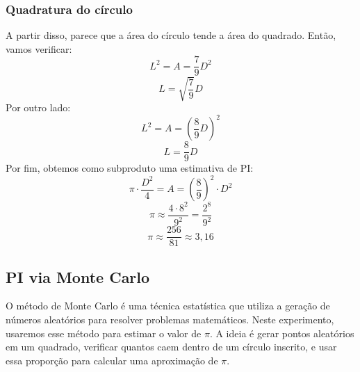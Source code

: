 \documentclass[12pt]{article}
\begin{document}
\subsubsection{Quadratura do círculo}
A partir disso, parece que a área do círculo tende a área do quadrado. Então, vamos verificar:
\[L^2=A=\frac{7}{9}D^2 \]
\[L=\sqrt{\frac{7}{9}}D\]
Por outro lado:
\[L^2=A=\left(\frac{8}{9}D\right)^2\]
\[L=\frac{8}{9}D\]
Por fim, obtemos como subproduto uma estimativa de PI:
\[\pi\cdot\frac{D^2}{4}=A=\left(\frac{8}{9}\right)^2\cdot D^2\]
\[\pi\approx\frac{4\cdot 8^2}{9^2}=\frac{2^8}{9^2}\]
\[\pi\approx\frac{256}{81}\approx 3,16\]
\newpage
\subsection{PI via Monte Carlo}
O método de Monte Carlo é uma técnica estatística que utiliza a geração de números aleatórios para resolver problemas matemáticos. Neste experimento, usaremos esse método para estimar o valor de \(\pi\). A ideia é gerar pontos aleatórios em um quadrado, verificar quantos caem dentro de um círculo inscrito, e usar essa proporção para calcular uma aproximação de \(\pi\). 
\end{document}
